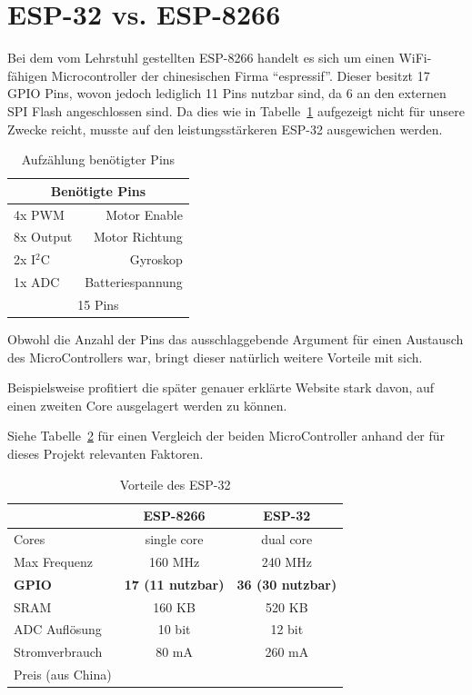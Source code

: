 \section{ESP-32 vs. ESP-8266}
Bei dem vom Lehrstuhl gestellten ESP-8266 handelt es sich um einen WiFi-fähigen Microcontroller der chinesischen Firma ``espressif''.
Dieser besitzt 17 GPIO Pins, wovon jedoch lediglich 11 Pins nutzbar sind, da 6 an den externen SPI Flash angeschlossen sind.
Da dies wie in Tabelle~\ref{table:pins} aufgezeigt nicht für unsere Zwecke reicht, musste auf den leistungsstärkeren ESP-32 ausgewichen werden.

\begin{table}[!ht]
\centering
\begin{tabular}{lr}
	\multicolumn{2}{c}{Benötigte Pins} \\ 
	\midrule[3pt] 
	4x PWM & Motor Enable \\ 
	\midrule 
	8x Output & Motor Richtung \\ 
	\midrule 
	2x I$^2$C & Gyroskop \\ 
	\midrule 
	1x ADC & Batteriespannung \\ 
	\midrule
	\midrule 
	\multicolumn{2}{c}{15 Pins} \\ 
	 
\end{tabular} 
\caption{Aufzählung benötigter Pins} 
\label{table:pins}
\end{table} 

Obwohl die Anzahl der Pins das ausschlaggebende Argument für einen Austausch des MicroControllers war, bringt dieser natürlich weitere Vorteile mit sich.

Beispielsweise profitiert die später genauer erklärte Website stark davon, auf einen zweiten Core ausgelagert werden zu können.

Siehe Tabelle~\ref{table:esp32} für einen Vergleich der beiden MicroController anhand der für dieses Projekt relevanten Faktoren.


\begin{table}[!ht]
\centering	
\begin{tabular}{lcc}
	& ESP-8266 & ESP-32 \\ 
	\midrule[3pt]
	Cores & single core & dual core \\ 
	\midrule
	Max Frequenz & 160 MHz & 240 MHz \\ 
	\midrule 
	\textbf{GPIO} & \textbf{17 (11 nutzbar)} & \textbf{36 (30 nutzbar)} \\ 
	\midrule
	SRAM & 160 KB & 520 KB \\ 
	\midrule
	ADC Auflösung & 10 bit & 12 bit \\ 
	\midrule
	Stromverbrauch & 80 mA & 260 mA \\ 
	\midrule
	Preis (aus China) & \EUR{2} & \EUR{4} \\ 
\end{tabular} 
\caption{Vorteile des ESP-32} 
\label{table:esp32}
\end{table} 


